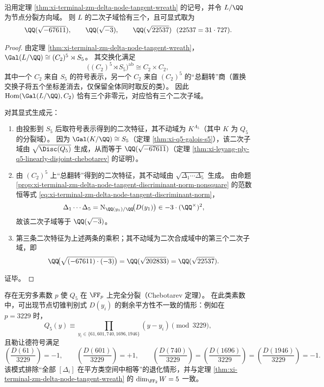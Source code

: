 \begin{conclusion}[节点分裂方向域的二次子域全分类]\label{con:xi-terminal-zm-delta-node-tangent-quadratic-subfields}
沿用定理 \ref{thm:xi-terminal-zm-delta-node-tangent-wreath} 的记号，并令 \(L/\QQ\) 为节点分裂方向域。
则 \(L\) 的二次子域恰有三个，且可显式取为
\[
\QQ(\sqrt{-67611}),\qquad
\QQ(\sqrt{-3}),\qquad
\QQ(\sqrt{22537})\ \ (22537=31\cdot 727).
\]
\end{conclusion}
\begin{proof}
由定理 \ref{thm:xi-terminal-zm-delta-node-tangent-wreath}，\(\Gal(L/\QQ)\cong (C_2)^5\rtimes S_5\)。
其交换化满足
\[
\bigl((C_2)^5\rtimes S_5\bigr)^{\mathrm{ab}}\cong C_2\times C_2,
\]
其中一个 \(C_2\) 来自 \(S_5\) 的符号表示，另一个 \(C_2\) 来自 \((C_2)^5\) 的“总翻转”商（置换交换子将五个坐标差消去，仅保留全体同时取反的类）。
因此 \(\mathrm{Hom}(\Gal(L/\QQ),C_2)\) 恰有三个非零元，对应恰有三个二次子域。
\par
对其显式生成元：
\begin{enumerate}
  \item 由投影到 \(S_5\) 后取符号表示得到的二次特征，其不动域为 \(K^{A_5}\)（其中 \(K\) 为 \(Q_5\) 的分裂域）。
  因为 \(\Gal(K/\QQ)\cong S_5\)（定理 \ref{thm:xi-q5-galois-s5}），该二次子域由 \(\sqrt{\Disc(Q_5)}\) 生成，从而等于 \(\QQ(\sqrt{-67611})\)（定理 \ref{thm:xi-leyang-ply-q5-linearly-disjoint-chebotarev} 的证明）。
  \item 由 \((C_2)^5\) 上“总翻转”得到的二次特征，其不动域由 \(\sqrt{\Delta_1\cdots \Delta_5}\) 生成。
  由命题 \ref{prop:xi-terminal-zm-delta-node-tangent-discriminant-norm-nonsquare} 的范数恒等式 \eqref{eq:xi-terminal-zm-delta-node-tangent-discriminant-norm}，
  \[
  \Delta_1\cdots \Delta_5
  =\mathrm N_{\QQ(y_1)/\QQ}\!\bigl(D(y_1)\bigr)\in -3\cdot(\QQ^\times)^2,
  \]
  故该二次子域等于 \(\QQ(\sqrt{-3})\)。
  \item 第三条二次特征为上述两条的乘积；其不动域为二次合成域中的第三个二次子域，即
  \[
  \QQ\!\bigl(\sqrt{(-67611)\cdot(-3)}\bigr)=\QQ(\sqrt{202833})=\QQ(\sqrt{22537}).
  \]
\end{enumerate}
证毕。
\end{proof}

\begin{remark}[完全分裂素数处的剩余平方性模式]\label{rem:xi-terminal-zm-delta-node-tangent-split-prime-pattern}
存在无穷多素数 \(p\) 使 \(Q_5\) 在 \(\FF_p\) 上完全分裂（Chebotarev 定理）。
在此类素数中，可出现节点切锥判别式 \(D(y_i)\) 的剩余平方性不一致的情形：例如在 \(p=3229\) 时，
\[
Q_5(y)\equiv \prod_{y_i\in\{61,601,740,1696,1946\}}(y-y_i)\pmod{3229},
\]
且勒让德符号满足
\[
\left(\frac{D(61)}{3229}\right)=-1,\qquad
\left(\frac{D(601)}{3229}\right)=+1,\qquad
\left(\frac{D(740)}{3229}\right)=
\left(\frac{D(1696)}{3229}\right)=
\left(\frac{D(1946)}{3229}\right)=-1.
\]
该模式排除“全部 \([\Delta_i]\) 在平方类空间中相等”的退化情形，并与定理 \ref{thm:xi-terminal-zm-delta-node-tangent-wreath} 的 \(\dim_{\FF_2}W=5\) 一致。
\end{remark}

